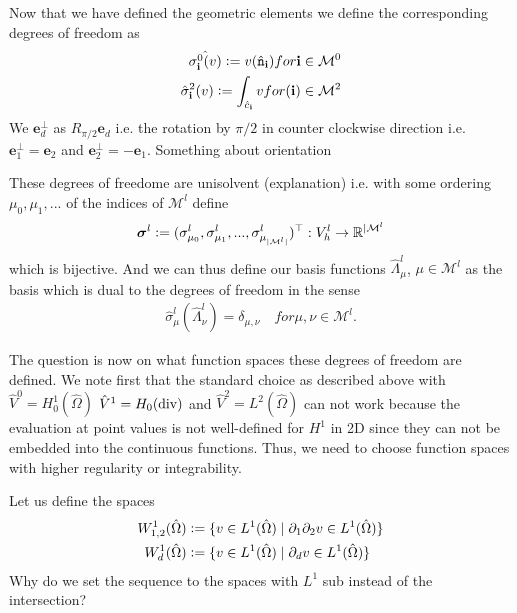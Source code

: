 \documentclass[../master_thesis.tex]{subfiles}
\begin{document}
Now that we have defined the geometric elements we define the corresponding 
degrees of freedom as 
\begin{align*}
    \hat{\sigma_\mathbf{i}^0(v) } \vcentcolon= v(\hat{\mathtt{n}}_\mathbf{i}) for \mathbf{i} \in \mathcal{M}^0
    \\ \hat{\sigma}_{\mathbf{i}}^2(v) 
        \vcentcolon= \int_{\hat{c}_{\mathbf{i}}} v 
        for (\mathbf{i}) \in \mathcal{M}^2
\end{align*}
We $\mathbf{e}_d^\perp$ as $R_{\pi/2}\mathbf{e}_d$ i.e. the rotation by $\pi /2$ in counter clockwise 
direction i.e. $\mathbf{e}^\perp_1= \mathbf{e}_2$ and $\mathbf{e}^\perp_2= -\mathbf{e}_1$.  
Something about orientation


These degrees of freedome are unisolvent (explanation) i.e. 
with some ordering $\mu_0, \mu_1, ...$ of the indices of $\mathcal{M}^l$
define 
\begin{align*}
    \bm{\sigma}^l \vcentcolon= (\sigma^l_{\mu_0}, \sigma^l_{\mu_1}, ..., \sigma^l_{\mu_{|\mathcal{M}^l|}})^\top
    : V^l_h \rightarrow \mathbb{R}^{|\mathcal{M}^l}
\end{align*}
which is bijective.
And we can thus define our basis functions 
$\hat{\Lambda}^l_\mu$, $\mu \in \mathcal{M}^l$ as the basis which is dual to the 
degrees of freedom in the sense 
\begin{align*}
    \hat{\sigma}_\mu^l(\hat{\Lambda}^l_\nu) = \delta_{\mu,\nu} \quad for \mu, \nu \in \mathcal{M}^l.
\end{align*}

The question is now  on what function spaces these degrees of freedom are defined. We note first that 
the standard choice as described above with $\hat{V}^0 = H^1_0(\hat{\Omega})$ 
$\hat{V}^1 = H_0(\operatorname{div})$ and $\hat{V}^2 = L^2(\hat{\Omega})$ can not work 
because the evaluation at point values is not well-defined for $H^1$ in 2D since 
they can not be embedded into the continuous functions. Thus, 
we need to choose function spaces with higher regularity or integrability.

Let us define the spaces
\begin{align*}
    W^1_{1,2}(\hat{\Omega}) &\vcentcolon= \{ v \in L^1(\hat{\Omega}) \mid \partial_1 \partial_2 v
        \in L^1(\hat{\Omega}) \}
    \\  W^1_d(\hat{\Omega}) &\vcentcolon= \{ v \in L^1(\hat{\Omega}) \mid \partial_d v
        \in L^1(\hat{\Omega}) \}
\end{align*}
{\color{red} Why do we set the sequence to the spaces with $L^1$ sub instead of the intersection?}
\end{document}
